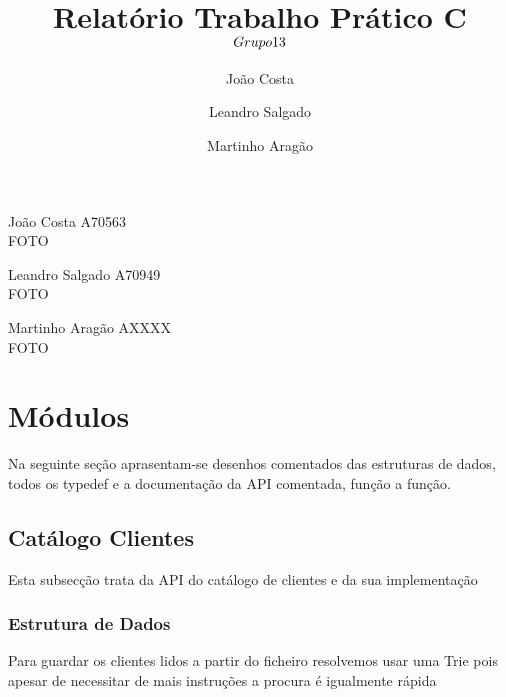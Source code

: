 \documentclass[12pt] {article}
\begin{document}
\title{Relatório Trabalho Prático C \\ $\small{Grupo 13}$}
\author{João Costa \and Leandro Salgado \and Martinho Aragão}

\maketitle


\begin{flushleft}
João Costa A70563 \\
FOTO
\end{flushleft}

\begin{flushleft}
Leandro Salgado A70949 \\
FOTO
\end{flushleft}

\begin{flushleft}
Martinho Aragão AXXXX \\
FOTO
\end{flushleft}

\newpage

\tableofcontents

\newpage

\section{Módulos}
Na seguinte seção aprasentam-se desenhos comentados das estruturas de dados,
todos os typedef e a documentação da API comentada, função a função.


\subsection{Catálogo Clientes}
\par Esta subsecção trata da API do catálogo de clientes e da sua implementação

\subsubsection{Estrutura de Dados}
\par
Para guardar os clientes lidos a partir do ficheiro resolvemos usar uma Trie pois apesar de
necessitar de mais instruções a procura é igualmente rápida
\end{document}
